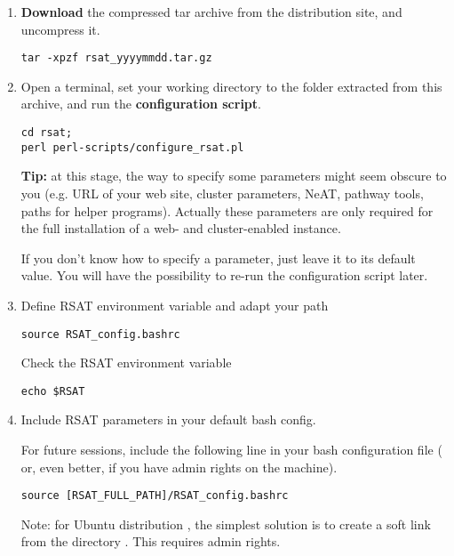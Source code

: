 \documentclass[12pt,a4paper, oneside]{scrreprt} %
\begin{document}
\begin{enumerate}
\item \textbf{Download} the compressed tar archive from the \RSAT
  distribution site, and uncompress it.

  \begin{lstlisting}
tar -xpzf rsat_yyyymmdd.tar.gz
  \end{lstlisting}
  
  
\item Open a terminal, set your working directory to the 
  folder extracted from this archive, and run the \RSAT
  \textbf{configuration script}.

  \begin{lstlisting}
cd rsat; 
perl perl-scripts/configure_rsat.pl
  \end{lstlisting}

  \textbf{Tip:} at this stage, the way to specify some parameters
  might seem obscure to you (e.g. URL of your web site, cluster
  parameters, NeAT, pathway tools, paths for helper
  programs). Actually these parameters are only required for the full
  installation of a web- and cluster-enabled \RSAT instance. 

  If you don't know how to specify a parameter, just leave it to its
  default value. You will have the possibility to re-run the
  configuration script later.

\item Define RSAT environment variable and adapt your path

  \begin{lstlisting}
source RSAT_config.bashrc
  \end{lstlisting}

Check the RSAT environment variable

  \begin{lstlisting}
echo $RSAT
  \end{lstlisting}

\item Include RSAT parameters in your default bash config.

For future sessions, include the following line in your bash
configuration file ( or, even better,
 if you have admin rights on the machine).

\begin{verbatim}
source [RSAT_FULL_PATH]/RSAT_config.bashrc
\end{verbatim}


Note: for Ubuntu distribution , the simplest solution is to create a
soft link from the directory . This requires
admin rights.


\end{enumerate}
\end{document}
